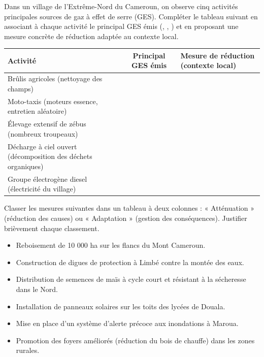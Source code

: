 \documentclass[11pt]{article}
\begin{document}
\begin{exercice}
Dans un village de l'Extrême-Nord du Cameroun, on observe cinq activités principales sources de gaz à effet de serre (GES). Compléter le tableau suivant en associant à chaque activité le principal GES émis (, , ) et en proposant une mesure concrète de réduction adaptée au contexte local.

\begin{center}
\begin{tabularx}{\linewidth}{|l|c|X|}\hline
\rowcolor{popblueL}\textbf{Activité} & \textbf{Principal GES émis} & \textbf{Mesure de réduction (contexte local)} \\ \hline
Brûlis agricoles (nettoyage des champs) & & \\ \hline
Moto-taxis (moteurs essence, entretien aléatoire) & & \\ \hline
Élevage extensif de zébus (nombreux troupeaux) & & \\ \hline
Décharge à ciel ouvert (décomposition des déchets organiques) & & \\ \hline
Groupe électrogène diesel (électricité du village) & & \\ \hline
\end{tabularx}
\end{center}
\end{exercice}

\begin{exercice}
Classer les mesures suivantes dans un tableau à deux colonnes : « Atténuation » (réduction des causes) ou « Adaptation » (gestion des conséquences). Justifier brièvement chaque classement.
\begin{itemize}
    \item Reboisement de 10 000 ha sur les flancs du Mont Cameroun.
    \item Construction de digues de protection à Limbé contre la montée des eaux.
    \item Distribution de semences de maïs à cycle court et résistant à la sécheresse dans le Nord.
    \item Installation de panneaux solaires sur les toits des lycées de Douala.
    \item Mise en place d'un système d'alerte précoce aux inondations à Maroua.
    \item Promotion des foyers améliorés (réduction du bois de chauffe) dans les zones rurales.
\end{itemize}
\end{exercice}
\end{document}
